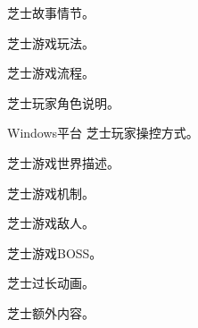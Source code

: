 \documentclass{proposal}
\begin{document}

  \begin{Story}
    芝士故事情节。
  \end{Story}

  \begin{Gameplay}
    芝士游戏玩法。
  \end{Gameplay}

  \begin{Process}
    芝士游戏流程。
  \end{Process}

  \begin{Player}
    芝士玩家角色说明。
  \end{Player}

  \begin{Control}{Windows平台}
    芝士玩家操控方式。
  \end{Control}

  \begin{World}
    芝士游戏世界描述。
  \end{World}

  \begin{Mechanics}
    芝士游戏机制。
  \end{Mechanics}

  \begin{Enemy}
    芝士游戏敌人。
  \end{Enemy}

  \begin{Boss}
    芝士游戏BOSS。
  \end{Boss}

  \begin{Cutscene}
    芝士过长动画。
  \end{Cutscene}

  \begin{Addition}
    芝士额外内容。
  \end{Addition}
  
\end{document}
